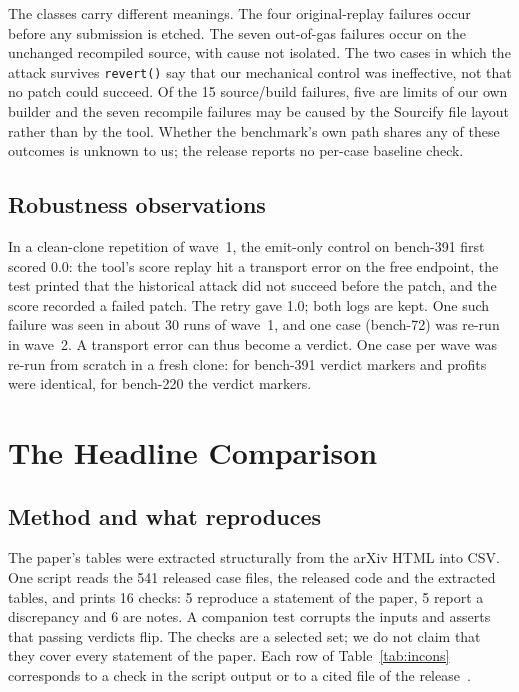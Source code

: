 \documentclass[conference]{IEEEtran}
\newcommand{\code}[1]{\texttt{#1}}
\begin{document}
The classes carry different meanings. The four original-replay failures occur before any submission is etched. The seven out-of-gas failures occur on the unchanged recompiled source, with cause not isolated. The two cases in which the attack survives \code{revert()} say that our mechanical control was ineffective, not that no patch could succeed. Of the 15 source/build failures, five are limits of our own builder and the seven recompile failures may be caused by the Sourcify file layout rather than by the tool. Whether the benchmark's own path shares any of these outcomes is unknown to us; the release reports no per-case baseline check.

\subsection{Robustness observations}
In a clean-clone repetition of wave~1, the emit-only control on bench-391 first scored 0.0: the tool's score replay hit a transport error on the free endpoint, the test printed that the historical attack did not succeed before the patch, and the score recorded a failed patch. The retry gave 1.0; both logs are kept. One such failure was seen in about 30 runs of wave~1, and one case (bench-72) was re-run in wave~2. A transport error can thus become a verdict. One case per wave was re-run from scratch in a fresh clone: for bench-391 verdict markers and profits were identical, for bench-220 the verdict markers.

\section{The Headline Comparison}
\label{sec:doc}
\subsection{Method and what reproduces}
The paper's tables were extracted structurally from the arXiv HTML into CSV. One script reads the 541 released case files, the released code and the extracted tables, and prints 16 checks: 5 reproduce a statement of the paper, 5 report a discrepancy and 6 are notes. A companion test corrupts the inputs and asserts that passing verdicts flip. The checks are a selected set; we do not claim that they cover every statement of the paper. Each row of Table~\ref{tab:incons} corresponds to a check in the script output or to a cited file of the release~\cite{audit}.
\end{document}
